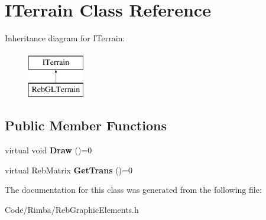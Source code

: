 \hypertarget{class_i_terrain}{}\section{I\+Terrain Class Reference}
\label{class_i_terrain}
Inheritance diagram for I\+Terrain\+:\begin{figure}[H]
\begin{center}
\leavevmode
\includegraphics[height=2.000000cm]{class_i_terrain}
\end{center}
\end{figure}
\subsection*{Public Member Functions}
\begin{DoxyCompactItemize}
\item 
virtual void {\bfseries Draw} ()=0\hypertarget{class_i_terrain_aceb37ac603eeebde3d1c0125114d648d}{}\label{class_i_terrain_aceb37ac603eeebde3d1c0125114d648d}

\item 
virtual Reb\+Matrix {\bfseries Get\+Trans} ()=0\hypertarget{class_i_terrain_a1fc14310d1f3a3e72453a39de16e8668}{}\label{class_i_terrain_a1fc14310d1f3a3e72453a39de16e8668}

\end{DoxyCompactItemize}


The documentation for this class was generated from the following file\+:\begin{DoxyCompactItemize}
\item 
Code/\+Rimba/Reb\+Graphic\+Elements.\+h\end{DoxyCompactItemize}
